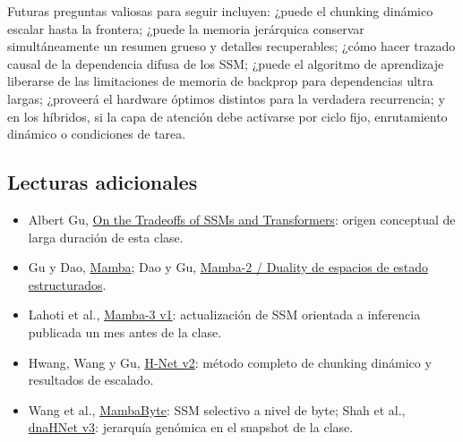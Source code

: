 \documentclass[a4paper]{article}
\begin{document}
Futuras preguntas valiosas para seguir incluyen: ¿puede el chunking dinámico escalar hasta la frontera; ¿puede la memoria jerárquica conservar simultáneamente un resumen grueso y detalles recuperables; ¿cómo hacer trazado causal de la dependencia difusa de los SSM; ¿puede el algoritmo de aprendizaje liberarse de las limitaciones de memoria de backprop para dependencias ultra largas; ¿proveerá el hardware óptimos distintos para la verdadera recurrencia; y en los híbridos, si la capa de atención debe activarse por ciclo fijo, enrutamiento dinámico o condiciones de tarea.

\subsection{Lecturas adicionales}

\begin{itemize}
  \item Albert Gu, \href{https://goombalab.github.io/blog/2025/tradeoffs/}{On the Tradeoffs of SSMs and Transformers}: origen conceptual de larga duración de esta clase.
  \item Gu y Dao, \href{https://arxiv.org/abs/2312.00752}{Mamba}; Dao y Gu, \href{https://arxiv.org/abs/2405.21060}{Mamba-2 / Duality de espacios de estado estructurados}.
  \item Lahoti et al., \href{https://arxiv.org/abs/2603.15569v1}{Mamba-3 v1}: actualización de SSM orientada a inferencia publicada un mes antes de la clase.
  \item Hwang, Wang y Gu, \href{https://arxiv.org/abs/2507.07955v2}{H-Net v2}: método completo de chunking dinámico y resultados de escalado.
  \item Wang et al., \href{https://arxiv.org/abs/2401.13660}{MambaByte}: SSM selectivo a nivel de byte; Shah et al., \href{https://arxiv.org/abs/2602.10603v3}{dnaHNet v3}: jerarquía genómica en el snapshot de la clase.
\end{itemize}
\end{document}
